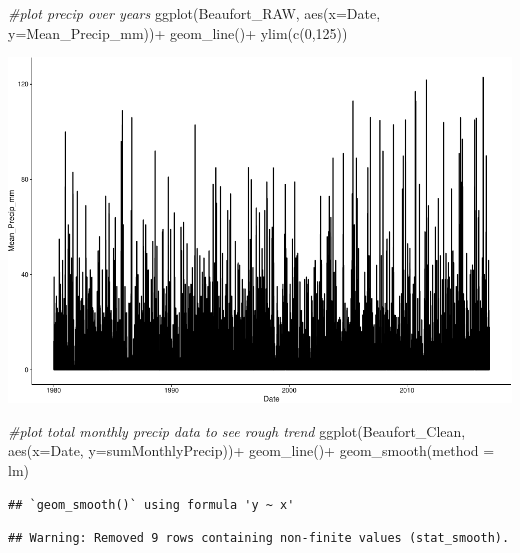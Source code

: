 \documentclass[
  12pt,
]{article}
\newenvironment{Shaded}{\begin{snugshade}}{\end{snugshade}}
\newcommand{\AttributeTok}[1]{\textcolor[rgb]{0.77,0.63,0.00}{#1}}
\newcommand{\CommentTok}[1]{\textcolor[rgb]{0.56,0.35,0.01}{\textit{#1}}}
\newcommand{\DecValTok}[1]{\textcolor[rgb]{0.00,0.00,0.81}{#1}}
\newcommand{\FunctionTok}[1]{\textcolor[rgb]{0.00,0.00,0.00}{#1}}
\newcommand{\NormalTok}[1]{#1}
\newcommand{\SpecialCharTok}[1]{\textcolor[rgb]{0.00,0.00,0.00}{#1}}
\begin{document}
\begin{Shaded}
\begin{Highlighting}[]
\CommentTok{\#plot precip over years}
\FunctionTok{ggplot}\NormalTok{(Beaufort\_RAW, }\FunctionTok{aes}\NormalTok{(}\AttributeTok{x=}\NormalTok{Date, }\AttributeTok{y=}\NormalTok{Mean\_Precip\_mm))}\SpecialCharTok{+}
  \FunctionTok{geom\_line}\NormalTok{()}\SpecialCharTok{+}
  \FunctionTok{ylim}\NormalTok{(}\FunctionTok{c}\NormalTok{(}\DecValTok{0}\NormalTok{,}\DecValTok{125}\NormalTok{))}
\end{Highlighting}
\end{Shaded}

\includegraphics{Project_Template_TLK_files/figure-latex/initial plots-1.pdf}

\begin{Shaded}
\begin{Highlighting}[]
\CommentTok{\#plot total monthly precip data to see rough trend}
\FunctionTok{ggplot}\NormalTok{(Beaufort\_Clean, }\FunctionTok{aes}\NormalTok{(}\AttributeTok{x=}\NormalTok{Date, }\AttributeTok{y=}\NormalTok{sumMonthlyPrecip))}\SpecialCharTok{+}
  \FunctionTok{geom\_line}\NormalTok{()}\SpecialCharTok{+}
  \FunctionTok{geom\_smooth}\NormalTok{(}\AttributeTok{method =}\NormalTok{ lm) }
\end{Highlighting}
\end{Shaded}

\begin{verbatim}
## `geom_smooth()` using formula 'y ~ x'
\end{verbatim}

\begin{verbatim}
## Warning: Removed 9 rows containing non-finite values (stat_smooth).
\end{verbatim}
\end{document}

